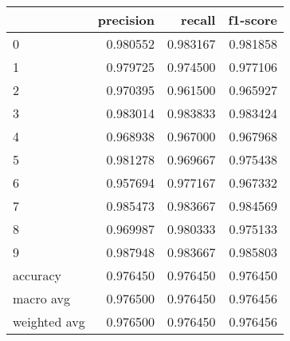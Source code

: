 \begin{tabular}{lrrr}
\toprule
 & precision & recall & f1-score \\
\midrule
0 & 0.980552 & 0.983167 & 0.981858 \\
1 & 0.979725 & 0.974500 & 0.977106 \\
2 & 0.970395 & 0.961500 & 0.965927 \\
3 & 0.983014 & 0.983833 & 0.983424 \\
4 & 0.968938 & 0.967000 & 0.967968 \\
5 & 0.981278 & 0.969667 & 0.975438 \\
6 & 0.957694 & 0.977167 & 0.967332 \\
7 & 0.985473 & 0.983667 & 0.984569 \\
8 & 0.969987 & 0.980333 & 0.975133 \\
9 & 0.987948 & 0.983667 & 0.985803 \\
accuracy & 0.976450 & 0.976450 & 0.976450 \\
macro avg & 0.976500 & 0.976450 & 0.976456 \\
weighted avg & 0.976500 & 0.976450 & 0.976456 \\
\bottomrule
\end{tabular}
